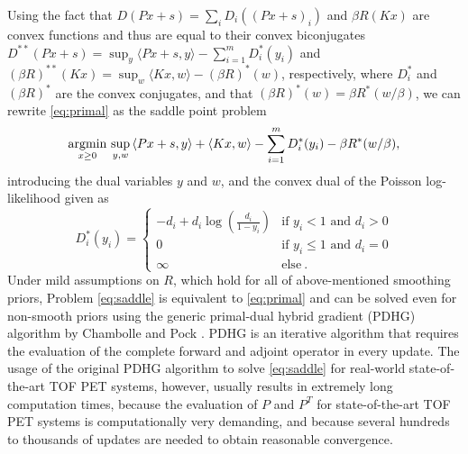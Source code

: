Using the fact that $D(Px + s) = \sum_i D_i((Px + s)_i)$ and $\beta R(Kx)$ are convex functions and thus are
equal to their convex biconjugates 
$D^{**}(Px + s) = \sup_y \langle Px + s, y \rangle - \sum_{i=1}^{m} D_i^*(y_i)$ 
and $(\beta R)^{**}(Kx) = \sup_w \langle Kx, w \rangle - (\beta R)^*(w)$, respectively, 
where $D_i^*$ and $(\beta R)^*$ are the convex conjugates,
and that $(\beta R)^*(w) = \beta R^*(w / \beta)$, 
we can rewrite \eqref{eq:primal} as the saddle point problem
%
\begin{equation}
\operatorname*{argmin}_{x\geq 0} \, \sup_{y,w} \,  \langle Px + s, y \rangle + \langle Kx, w \rangle - \sum_{i=1}^{m} D_i^*(y_i) - \beta R^*(w/\beta) ,
\label{eq:saddle}
\end{equation}
%
introducing the dual variables $y$ and $w$, and the convex dual of the Poisson log-likelihood given as
%
\begin{equation}
D_i^*(y_i) =
\begin{cases}
-d_i + d_i \log \left( \frac{d_i}{1-y_i} \right) & \text{if } y_i < 1 \text{ and } d_i > 0 \\
0 & \text{if } y_i \leq 1 \text{ and } d_i = 0 \\
\infty & \text{else} \ .
\end{cases}
\end{equation}
%
Under mild assumptions on $R$, which hold for all of above-mentioned smoothing priors, Problem \eqref{eq:saddle} is equivalent to \eqref{eq:primal} and
can be solved even for non-smooth priors using the generic primal-dual hybrid gradient (PDHG) 
algorithm by Chambolle and Pock \cite{Chambolle2011}.
PDHG is an iterative algorithm that requires the evaluation of the complete forward and adjoint operator
in every update.
The usage of the original PDHG algorithm to solve \eqref{eq:saddle} for real-world state-of-the-art
TOF PET systems, however, usually results in extremely long computation times, 
because the evaluation of $P$ and $P^T$
for state-of-the-art TOF PET systems is computationally very demanding, and 
because several hundreds to thousands of updates are needed to obtain reasonable convergence.

